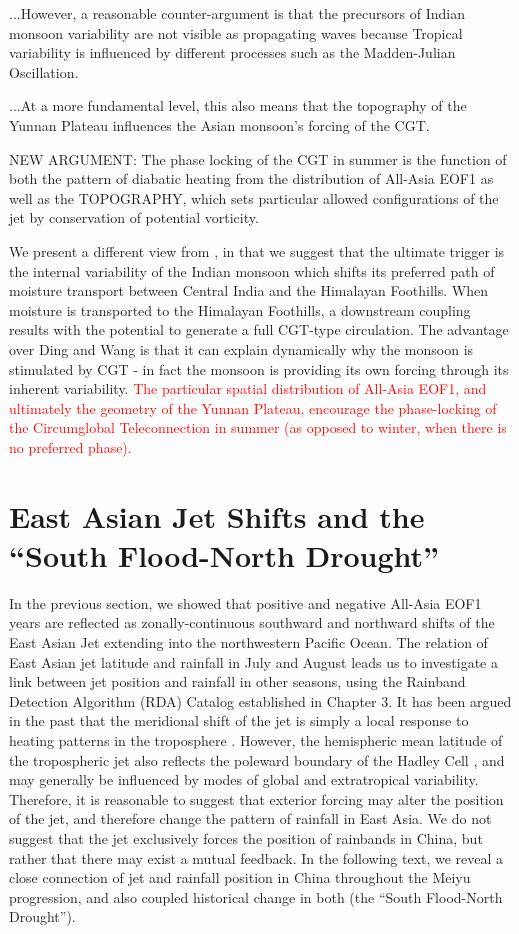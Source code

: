 	...However, a reasonable counter-argument is that the precursors of Indian monsoon variability are not visible as propagating waves because Tropical variability is influenced by different processes such as the Madden-Julian Oscillation.

	...At a more fundamental level, this also means that the topography of the Yunnan Plateau influences the Asian monsoon's forcing of the CGT. 
	
	NEW ARGUMENT: The phase locking of the CGT in summer is the function of both the pattern of diabatic heating from the distribution of All-Asia EOF1 as well as the TOPOGRAPHY, which sets particular allowed configurations of the jet by conservation of potential vorticity.

	We present a different view from \citet{Ding2007}, in that we suggest that the ultimate trigger is the internal variability of the Indian monsoon which shifts its preferred path of moisture transport between Central India and the Himalayan Foothills. When moisture is transported to the Himalayan Foothills, a downstream coupling results with the potential to generate a full CGT-type circulation. The advantage over Ding and Wang is that it can explain dynamically why the monsoon is stimulated by CGT - in fact the monsoon is providing its own forcing through its inherent variability. \textcolor{red}{The particular spatial distribution of All-Asia EOF1, and ultimately the geometry of the Yunnan Plateau, encourage the phase-locking of the Circumglobal Teleconnection in summer (as opposed to winter, when there is no preferred phase).} 

\section{East Asian Jet Shifts and the ``South Flood-North Drought''}

	In the previous section, we showed that positive and negative All-Asia EOF1 years are reflected as zonally-continuous southward and northward shifts of the East Asian Jet extending into the northwestern Pacific Ocean. The relation of East Asian jet latitude and rainfall in July and August leads us to investigate a link between jet position and rainfall in other seasons, using the Rainband Detection Algorithm (RDA) Catalog established in Chapter 3. It has been argued in the past that the meridional shift of the jet is simply a local response to heating patterns in the troposphere \citep{Yu and Zhou}. However, the hemispheric mean latitude of the tropospheric jet also reflects the poleward boundary of the Hadley Cell \citep{Kang2015}, and may generally be influenced by modes of global and extratropical variability. Therefore, it is reasonable to suggest that exterior forcing may alter the position of the jet, and therefore change the pattern of rainfall in East Asia. We do not suggest that the jet exclusively forces the position of rainbands in China, but rather that there may exist a mutual feedback. In the following text, we reveal a close connection of jet and rainfall position in China throughout the Meiyu progression, and also coupled historical change in both (the ``South Flood-North Drought'').
	
